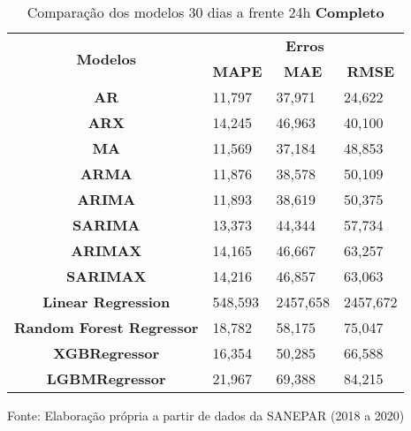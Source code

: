 \begin{table}[H]
	\centering
	\caption{Comparação dos modelos 30 dias a frente 24h \textbf{Completo} }\label{tb:60-24cm}
	\begin{tabular}{@{}clll@{}}
		\toprule
		\multirow{2}{*}{\textbf{Modelos}} & \multicolumn{3}{c}{\textbf{Erros}}                                                                       \\ \cmidrule(l){2-4} 
		& \multicolumn{1}{c}{\textbf{MAPE}} & \multicolumn{1}{c}{\textbf{MAE}} & \multicolumn{1}{c}{\textbf{RMSE}} \\ \hline
\textbf{AR}                       & 11,797                            & 37,971                           & 24,622                            \\
\textbf{ARX}                      & 14,245                            & 46,963                           & 40,100                            \\
\textbf{MA}                       & 11,569                            & 37,184                           & 48,853                            \\
\textbf{ARMA}                     & 11,876                            & 38,578                           & 50,109                            \\
\textbf{ARIMA}                    & 11,893                            & 38,619                           & 50,375                            \\
\textbf{SARIMA}                   & 13,373                            & 44,344                           & 57,734                            \\
\textbf{ARIMAX}                   & 14,165                            & 46,667                           & 63,257                            \\
\textbf{SARIMAX}                  & 14,216                            & 46,857                           & 63,063                            \\
\textbf{Linear Regression}        & 548,593                           & 2457,658                         & 2457,672                          \\
\textbf{Random Forest Regressor}  & 18,782                            & 58,175                           & 75,047                            \\
\textbf{XGBRegressor}             & 16,354                            & 50,285                           & 66,588                            \\
\textbf{LGBMRegressor}            & 21,967                            & 69,388                           & 84,215                            \\ \bottomrule
	\end{tabular}

Fonte: Elaboração própria a partir de dados da SANEPAR (2018 a 2020)
\end{table}